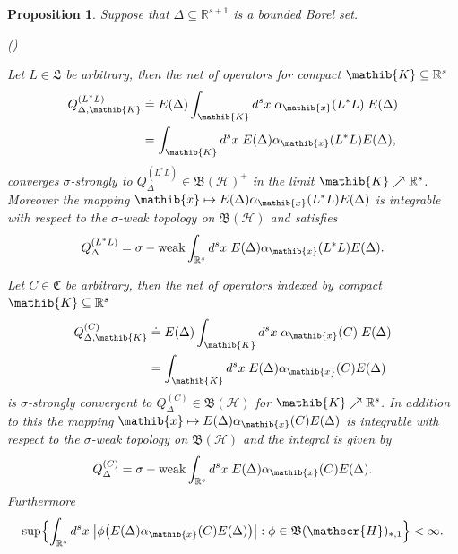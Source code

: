 \documentclass[11pt,twoside,openright]{report}
\theoremstyle{definition}
\theoremstyle{plain}
\newtheorem{Pro}[Def]{Proposition}
\theoremstyle{remark}
\theoremstyle{assumption}
\DeclareMathOperator{\sw}{\sigma-weak}
\newcommand{\Bset}[1]{\Bigl\{ #1 \Bigr\}}
\newcommand{\babs}[1]{\bigl\lvert #1 \bigr\rvert}
\newcommand{\Cfrak}{\mathfrak{C}}
\newcommand{\Lfrak}{\mathfrak{L}}
\newcommand{\Kib}{\mathib{K}}
\newcommand{\xib}{\mathib{x}}
\newcommand{\Rs}{\mathbb{R}^s}
\newcommand{\Rsone}{\mathbb{R}^{s + 1}}
\newcommand{\BH}{\mathfrak{B} ( \mathscr{H} )}
\newcommand{\ED}{E ( \Delta )}
\newcommand{\aibx}{\alpha_\mathib{x}}
\newcounter{propitem}
\newenvironment{proplist}{\begin{list}{(\roman{propitem})}%
  {\usecounter{propitem} \setlength{\topsep}{0ex}%
   \setlength{\parsep}{0.2ex} \setlength{\itemsep}{0.4ex}%
   \setlength{\leftmargin}{0em} \setlength{\itemindent}{0.5em}%
   }}{\end{list}}
\begin{document}
\begin{Pro}
  \label{Pro-counter-integrals}
  Suppose that $\Delta \subseteq \Rsone$ is a bounded Borel set.
  \begin{proplist}
  \item Let $L \in \Lfrak$ be arbitrary, then the net of operators for
    compact $\Kib \subseteq \Rs$
    \begin{equation*}
      \begin{split}
        Q_{\Delta , \Kib}^{( L^* L )} & \doteq \ED \int_\Kib d^s x \;
        \aibx ( L^* L ) \; \ED \\
        & = \int_\Kib d^s x \; \ED \aibx ( L^* L ) \ED \text{,}
      \end{split}
    \end{equation*}
    converges $\sigma$-strongly to $Q_\Delta^{( L^* L )} \in \BH^+$ in
    the limit $\Kib \nearrow \Rs$. Moreover the mapping $\xib \mapsto
    \ED \aibx ( L^* L ) \ED$ is integrable with respect to the
    $\sigma$-weak topology on $\BH$ and satisfies 
    \begin{equation*}
      Q_\Delta^{( L^* L )} = \sw \int_{\Rs} d^s x \; \ED \aibx ( L^* L
      ) \ED \text{.}
    \end{equation*}
  \item Let $C \in \Cfrak$ be arbitrary, then the net of operators
    indexed by compact $\Kib \subseteq \Rs$
    \begin{equation*}
      \begin{split}
        Q_{\Delta , \Kib}^{( C )} & \doteq \ED \int_\Kib d^s x \;
        \aibx ( C ) \; \ED \\
        & = \int_\Kib d^s x \; \ED \aibx ( C ) \ED 
      \end{split}
    \end{equation*}
    is $\sigma$-strongly convergent to $Q_\Delta^{( C )} \in \BH$ for
    $\Kib \nearrow \Rs$. In addition to this the mapping $\xib \mapsto
    \ED \aibx ( C ) \ED$ is integrable with respect to the
    $\sigma$-weak topology on $\BH$ and the integral is given by
    \begin{equation*}
      Q_\Delta^{( C )} = \sw \int_{\Rs} d^s x \; \ED \aibx ( C ) \ED
      \text{.} 
    \end{equation*}
    Furthermore
    \begin{equation}
      \label{eq-supremum-seminorm}
      \sup \Bset{\int_{\Rs} d^s x \; \babs{\phi \bigl( \ED \aibx ( C )
      \ED \bigr)} : \phi \in \BH_{*,1}} < \infty \text{.}
    \end{equation}
  \end{proplist}
\end{Pro}
\end{document}
